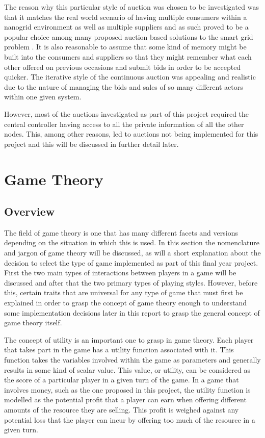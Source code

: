 \documentclass[a4paper, notitlepage]{report}
\begin{document}
The reason why this particular style of auction was chosen to be investigated
was that it matches the real world scenario of having multiple consumers within
a nanogrid environment as well as multiple suppliers and as such proved to be a
popular choice among many proposed auction based solutions to the smart grid
problem \cite{ramachandran2011intelligent}. It is also reasonable to
assume that some kind of memory might be built into the consumers and suppliers
so that they might remember what each other offered on previous occasions and
submit bids in order to be accepted quicker. The iterative style of the
continuous auction was appealing and realistic due to the nature of managing the
bids and sales of so many different actors within one given system.

However, most of the auctions investigated as part of this project required the central
controller having access to all the private information of all the other nodes.
This, among other reasons, led to auctions not being implemented for this
project and this will be discussed in further detail later.
\chapter{Game Theory}
\label{sec:org4c89831}
\section{Overview}
\label{sec:org422f0b2}
The field of game theory is one that has many different facets and versions
depending on the situation in which this is used. In this section the
nomenclature and jargon of game theory will be discussed, as will a short
explanation about the decision to select the type of game implemented as part of
this final year project. First the two main types of interactions between
players in a game will be discussed and after that the two primary types of
playing styles. However, before this, certain traits that are universal for any
type of game that must first be explained in order to grasp the concept of game
theory enough to understand some implementation decisions later in this report
to grasp the general concept of game theory itself.

The concept of utility is an important one to grasp in game theory. Each player
that takes part in the game has a utility function associated with it. This
function takes the variables involved within the game as parameters and
generally results in some kind of scalar value. This value, or utility, can be
considered as the score of a particular player in a given turn of the game. In a
game that involves money, such as the one proposed in this project, the utility
function is modelled as the potential profit that a player can earn when offering
different amounts of the resource they are selling. This profit is weighed
against any potential loss that the player can incur by offering too much of the
resource in a given turn.
\end{document}

